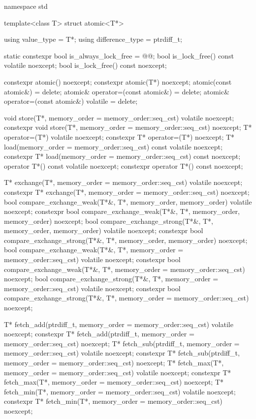 \begin{codeblock}
namespace std {
  template<class T> struct atomic<T*> {
    using value_type = T*;
    using difference_type = ptrdiff_t;

    static constexpr bool is_always_lock_free = @@;
    bool is_lock_free() const volatile noexcept;
    bool is_lock_free() const noexcept;

    constexpr atomic() noexcept;
    constexpr atomic(T*) noexcept;
    atomic(const atomic&) = delete;
    atomic& operator=(const atomic&) = delete;
    atomic& operator=(const atomic&) volatile = delete;

    void store(T*, memory_order = memory_order::seq_cst) volatile noexcept;
    constexpr void store(T*, memory_order = memory_order::seq_cst) noexcept;
    T* operator=(T*) volatile noexcept;
    constexpr T* operator=(T*) noexcept;
    T* load(memory_order = memory_order::seq_cst) const volatile noexcept;
    constexpr T* load(memory_order = memory_order::seq_cst) const noexcept;
    operator T*() const volatile noexcept;
    constexpr operator T*() const noexcept;

    T* exchange(T*, memory_order = memory_order::seq_cst) volatile noexcept;
    constexpr T* exchange(T*, memory_order = memory_order::seq_cst) noexcept;
    bool compare_exchange_weak(T*&, T*, memory_order, memory_order) volatile noexcept;
    constexpr bool compare_exchange_weak(T*&, T*, memory_order, memory_order) noexcept;
    bool compare_exchange_strong(T*&, T*, memory_order, memory_order) volatile noexcept;
    constexpr bool compare_exchange_strong(T*&, T*, memory_order, memory_order) noexcept;
    bool compare_exchange_weak(T*&, T*,
                               memory_order = memory_order::seq_cst) volatile noexcept;
    constexpr bool compare_exchange_weak(T*&, T*,
                                         memory_order = memory_order::seq_cst) noexcept;
    bool compare_exchange_strong(T*&, T*,
                                 memory_order = memory_order::seq_cst) volatile noexcept;
    constexpr bool compare_exchange_strong(T*&, T*,
                                           memory_order = memory_order::seq_cst) noexcept;

    T* fetch_add(ptrdiff_t, memory_order = memory_order::seq_cst) volatile noexcept;
    constexpr T* fetch_add(ptrdiff_t, memory_order = memory_order::seq_cst) noexcept;
    T* fetch_sub(ptrdiff_t, memory_order = memory_order::seq_cst) volatile noexcept;
    constexpr T* fetch_sub(ptrdiff_t, memory_order = memory_order::seq_cst) noexcept;
    T* fetch_max(T*, memory_order = memory_order::seq_cst) volatile noexcept;
    constexpr T* fetch_max(T*, memory_order = memory_order::seq_cst) noexcept;
    T* fetch_min(T*, memory_order = memory_order::seq_cst) volatile noexcept;
    constexpr T* fetch_min(T*, memory_order = memory_order::seq_cst) noexcept;

}}
\end{codeblock}

